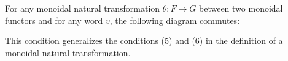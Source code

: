 For any monoidal natural transformation $\theta : F \to G$ between two monoidal functors and for any word $v$, the following diagram commutes:

\begin{center}
\end{center}

This condition generalizes the conditions (5) and (6) in the definition of a monoidal natural transformation.
